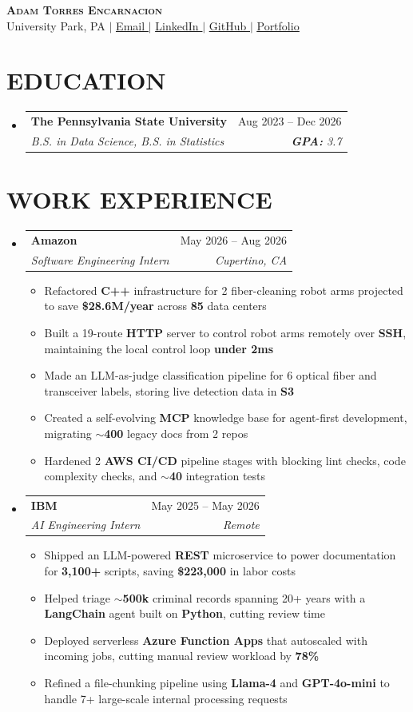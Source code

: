 \documentclass[letterpaper,11pt]{article}
\makeatletter
\newcommand{\resumeItem}[1]{
  \item\small{
    {#1 \vspace{-4pt}}
  }
}
\newcommand{\resumeSubheading}[4]{
  \item
    \begin{tabular*}{0.97\textwidth}[t]{l@{\extracolsep{\fill}}r}
      \textbf{#1} & #2 \\
      \textit{\small#3} & \textit{\small #4} \\
    \end{tabular*}\vspace{-7pt}
}
\newcommand{\resumeSubHeadingListStart}{\begin{itemize}[leftmargin=0.15in, label={}]}
\newcommand{\resumeSubHeadingListEnd}{\end{itemize}}
\newcommand{\resumeItemListStart}{\begin{itemize}[itemsep=4.5pt]}
\newcommand{\resumeItemListEnd}{\end{itemize}\vspace{-6pt}}
\makeatother
\begin{document}
\begin{center}
    \textbf{\Huge \scshape Adam Torres Encarnacion} \\ \vspace{1pt}
    \small University Park, PA $|$ \href{mailto:art5809@psu.edu}{\underline{Email \faEnvelope}} $|$
    \href{https://www.linkedin.com/in/adam-torres-encarnacion/}{\underline{LinkedIn \faLinkedin}} $|$
    \href{https://github.com/0xABAN}{\underline{GitHub \faGithub}} $|$
    \href{https://advm.dev/}{\underline{Portfolio \raisebox{-0.0625em}{\resizebox{0.875em}{0.875em}{$\blacktriangle$}}}}
\end{center}


\section{\textbf{EDUCATION}}
  \resumeSubHeadingListStart
    \resumeSubheading
    {The Pennsylvania State University}{Aug 2023 -- Dec 2026}
      {B.S. in Data Science, B.S. in Statistics}{\textbf{\textit{GPA:}} 3.7}
  \resumeSubHeadingListEnd

\section{\textbf{WORK EXPERIENCE}}
  \resumeSubHeadingListStart
  \resumeSubheading
      {Amazon}{May 2026 -- Aug 2026}
      {Software Engineering Intern}{Cupertino, CA}
      \resumeItemListStart
        \resumeItem{Refactored \textbf{C++} infrastructure for 2 fiber-cleaning robot arms projected to save \textbf{\$28.6M/year} across \textbf{85} data centers}
        \resumeItem{Built a 19-route \textbf{HTTP} server to control robot arms remotely over \textbf{SSH}, maintaining the local control loop \textbf{under 2ms}}
        \resumeItem{Made an LLM-as-judge classification pipeline for 6 optical fiber and transceiver labels, storing live detection data in \textbf{S3}}
        \resumeItem{Created a self-evolving \textbf{MCP} knowledge base for agent-first development, migrating \textbf{$\sim$400} legacy docs from 2 repos}
        \resumeItem{Hardened 2 \textbf{AWS CI/CD} pipeline stages with blocking lint checks, code complexity checks, and \textbf{$\sim$40} integration tests}
      \resumeItemListEnd
    \resumeSubheading
      {IBM}{May 2025 -- May 2026}
      {AI Engineering Intern}{Remote}
      \resumeItemListStart
        \resumeItem{Shipped an LLM-powered \textbf{REST} microservice to power documentation for \textbf{3,100+} scripts, saving \textbf{\$223,000} in labor costs}
        \resumeItem{Helped triage \textbf{$\sim$500k} criminal records spanning 20+ years with a \textbf{LangChain} agent built on \textbf{Python}, cutting review time}
        \resumeItem{Deployed serverless \textbf{Azure Function Apps} that autoscaled with incoming jobs, cutting manual review workload by \textbf{78\%}}
        \resumeItem{Refined a file-chunking pipeline using \textbf{Llama-4} and \textbf{GPT-4o-mini} to handle 7+ large-scale internal processing requests}
      \resumeItemListEnd
  \resumeSubHeadingListEnd
\end{document}
